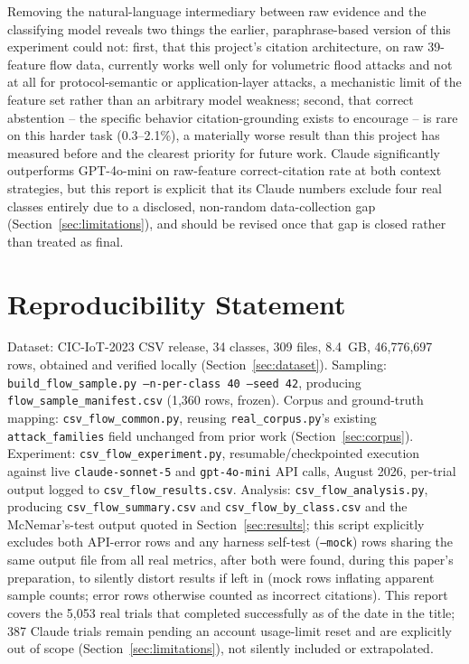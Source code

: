 \documentclass[11pt]{article}
\begin{document}
Removing the natural-language intermediary between raw evidence and the
classifying model reveals two things the earlier, paraphrase-based version
of this experiment could not: first, that this project's citation
architecture, on raw 39-feature flow data, currently works well only for
volumetric flood attacks and not at all for protocol-semantic or
application-layer attacks, a mechanistic limit of the feature set rather
than an arbitrary model weakness; second, that correct abstention -- the
specific behavior citation-grounding exists to encourage -- is rare on this
harder task (0.3--2.1\%), a materially worse result than this project has
measured before and the clearest priority for future work. Claude
significantly outperforms GPT-4o-mini on raw-feature correct-citation rate
at both context strategies, but this report is explicit that its Claude
numbers exclude four real classes entirely due to a disclosed, non-random
data-collection gap (Section~\ref{sec:limitations}), and should be revised
once that gap is closed rather than treated as final.

\section*{Reproducibility Statement}

Dataset: CIC-IoT-2023 CSV release, 34 classes, 309 files, 8.4~GB,
46{,}776{,}697 rows, obtained and verified locally
(Section~\ref{sec:dataset}). Sampling: \texttt{build\_flow\_sample.py
--n-per-class 40 --seed 42}, producing \texttt{flow\_sample\_manifest.csv}
(1{,}360 rows, frozen). Corpus and ground-truth mapping:
\texttt{csv\_flow\_common.py}, reusing \texttt{real\_corpus.py}'s existing
\texttt{attack\_families} field unchanged from prior work
(Section~\ref{sec:corpus}). Experiment: \texttt{csv\_flow\_experiment.py},
resumable/checkpointed execution against live \texttt{claude-sonnet-5} and
\texttt{gpt-4o-mini} API calls, August 2026, per-trial output logged to
\texttt{csv\_flow\_results.csv}. Analysis:
\texttt{csv\_flow\_analysis.py}, producing \texttt{csv\_flow\_summary.csv}
and \texttt{csv\_flow\_by\_class.csv} and the McNemar's-test output quoted
in Section~\ref{sec:results}; this script explicitly excludes both
API-error rows and any harness self-test (\texttt{--mock}) rows sharing the
same output file from all real metrics, after both were found, during this
paper's preparation, to silently distort results if left in (mock rows
inflating apparent sample counts; error rows otherwise counted as incorrect
citations). This report covers the 5{,}053 real trials that completed
successfully as of the date in the title; 387 Claude trials remain pending
an account usage-limit reset and are explicitly out of scope
(Section~\ref{sec:limitations}), not silently included or extrapolated.
\end{document}
